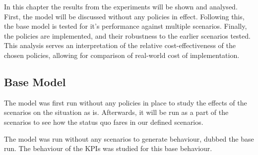 In this chapter the results from the experiments will be shown and analysed. First, the model will be discussed without any policies in effect. Following this, the base model is tested for it's performance against multiple scenarios. Finally, the policies are implemented, and their robustness to the earlier scenarios tested. This analysis serves an interpretation of the relative cost-effectiveness of the chosen policies, allowing for comparison of real-world cost of implementation. 

\subsection{Base Model}

The model was first run without any policies in place to study the effects of the scenarios on the situation as is. Afterwards, it will be run as a part of the scenarios to see how the status quo fares in our defined scenarios. 

The model was run without any scenarios to generate behaviour, dubbed the base run. The behaviour of the KPIs was studied for this base behaviour.

